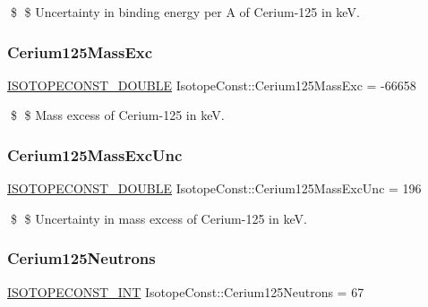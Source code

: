 \$ \$ Uncertainty in binding energy per A of Cerium-\/125 in keV. \mbox{\label{group___isotope_const-_cerium-_ce125_gada492273f1040a5e7ba2136012c7fdeb}} 
\subsubsection{\texorpdfstring{Cerium125\+Mass\+Exc}{Cerium125MassExc}}
{\footnotesize\ttfamily \mbox{\hyperlink{group___isotope_const-_macros_ga8f45a7272ce02c0b4c65c44636ed719a}{I\+S\+O\+T\+O\+P\+E\+C\+O\+N\+S\+T\+\_\+\+D\+O\+U\+B\+LE}} Isotope\+Const\+::\+Cerium125\+Mass\+Exc = -\/66658}

\$ \$ Mass excess of Cerium-\/125 in keV. \mbox{\label{group___isotope_const-_cerium-_ce125_ga06c9f7db474cb8a95c45486bd69c9478}} 
\subsubsection{\texorpdfstring{Cerium125\+Mass\+Exc\+Unc}{Cerium125MassExcUnc}}
{\footnotesize\ttfamily \mbox{\hyperlink{group___isotope_const-_macros_ga8f45a7272ce02c0b4c65c44636ed719a}{I\+S\+O\+T\+O\+P\+E\+C\+O\+N\+S\+T\+\_\+\+D\+O\+U\+B\+LE}} Isotope\+Const\+::\+Cerium125\+Mass\+Exc\+Unc = 196}

\$ \$ Uncertainty in mass excess of Cerium-\/125 in keV. \mbox{\label{group___isotope_const-_cerium-_ce125_ga59fac012cbcdc45c73b0c84cce27584f}} 
\subsubsection{\texorpdfstring{Cerium125\+Neutrons}{Cerium125Neutrons}}
{\footnotesize\ttfamily \mbox{\hyperlink{group___isotope_const-_macros_ga5f18360b3e99483a35c32d789e62621c}{I\+S\+O\+T\+O\+P\+E\+C\+O\+N\+S\+T\+\_\+\+I\+NT}} Isotope\+Const\+::\+Cerium125\+Neutrons = 67}

